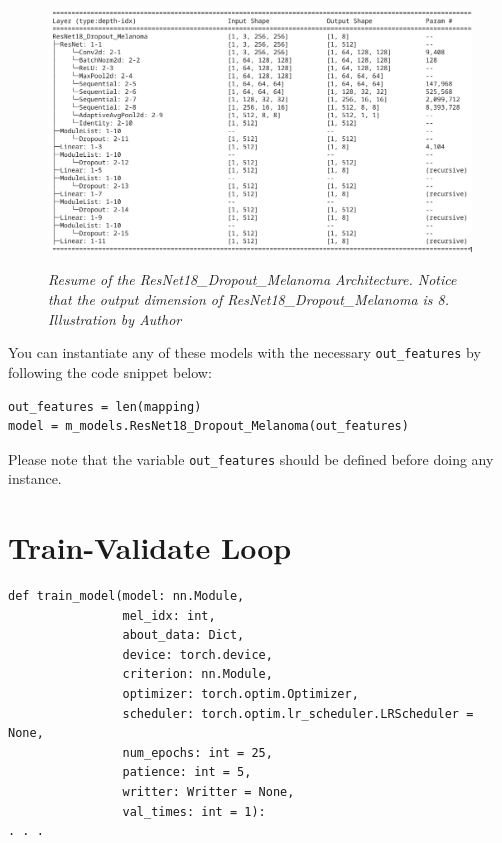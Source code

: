 \newpage

\begin{figure}[H]
\centering
\includegraphics[width=\textwidth]{imatges/methodological_contribution/ResNet18_Dropout_Melanoma.png}
\caption[Resume of the ResNet18\_Dropout\_Melanoma Architecture]{\textit{Resume of the ResNet18\_Dropout\_Melanoma Architecture. Notice that the output dimension of ResNet18\_Dropout\_Melanoma is 8. Illustration by Author}}
{\label{fig:resnet-18-dropout-melanoma-arch}}
\end{figure}

You can instantiate any of these models with the necessary {\tt out\_features} by following the code snippet below:

\begin{Verbatim}[fontsize=\small]
out_features = len(mapping)
model = m_models.ResNet18_Dropout_Melanoma(out_features)
\end{Verbatim}

Please note that the variable {\tt out\_features} should be defined before doing any instance.

\section{Train-Validate Loop}

\begin{Verbatim}[fontsize=\small]
def train_model(model: nn.Module,
                mel_idx: int,
                about_data: Dict,
                device: torch.device,
                criterion: nn.Module,
                optimizer: torch.optim.Optimizer,
                scheduler: torch.optim.lr_scheduler.LRScheduler = None,
                num_epochs: int = 25,
                patience: int = 5,
                writter: Writter = None,
                val_times: int = 1):
. . .
\end{Verbatim}

